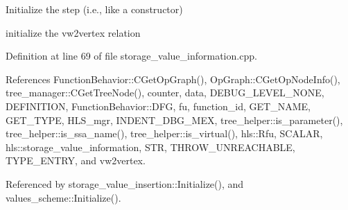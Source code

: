Initialize the step (i.\+e., like a constructor) 

initialize the vw2vertex relation 

Definition at line 69 of file storage\+\_\+value\+\_\+information.\+cpp.



References Function\+Behavior\+::\+C\+Get\+Op\+Graph(), Op\+Graph\+::\+C\+Get\+Op\+Node\+Info(), tree\+\_\+manager\+::\+C\+Get\+Tree\+Node(), counter, data, D\+E\+B\+U\+G\+\_\+\+L\+E\+V\+E\+L\+\_\+\+N\+O\+NE, D\+E\+F\+I\+N\+I\+T\+I\+ON, Function\+Behavior\+::\+D\+FG, fu, function\+\_\+id, G\+E\+T\+\_\+\+N\+A\+ME, G\+E\+T\+\_\+\+T\+Y\+PE, H\+L\+S\+\_\+mgr, I\+N\+D\+E\+N\+T\+\_\+\+D\+B\+G\+\_\+\+M\+EX, tree\+\_\+helper\+::is\+\_\+parameter(), tree\+\_\+helper\+::is\+\_\+ssa\+\_\+name(), tree\+\_\+helper\+::is\+\_\+virtual(), hls\+::\+Rfu, S\+C\+A\+L\+AR, hls\+::storage\+\_\+value\+\_\+information, S\+TR, T\+H\+R\+O\+W\+\_\+\+U\+N\+R\+E\+A\+C\+H\+A\+B\+LE, T\+Y\+P\+E\+\_\+\+E\+N\+T\+RY, and vw2vertex.



Referenced by storage\+\_\+value\+\_\+insertion\+::\+Initialize(), and values\+\_\+scheme\+::\+Initialize().

